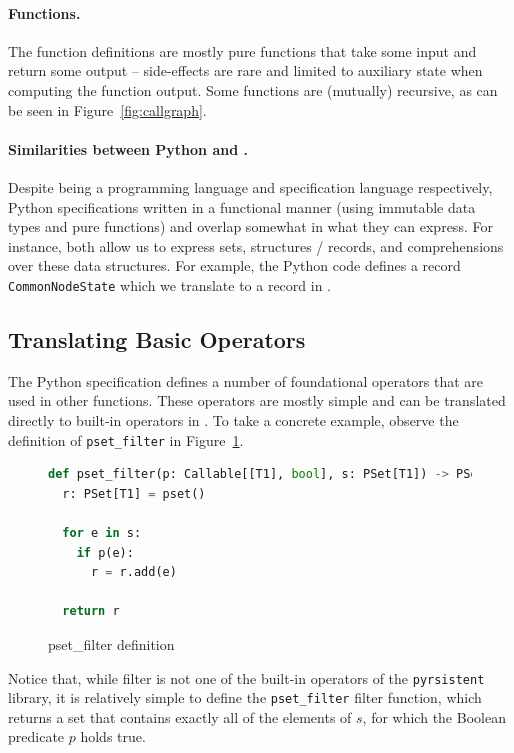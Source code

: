\paragraph{Functions.} The function definitions are mostly pure functions that
take some input and return some output -- side-effects are rare and limited to
auxiliary state when computing the function output. Some functions are
(mutually) recursive, as can be seen in Figure~\ref{fig:callgraph}.

\paragraph{Similarities between Python and \tlap{}.} Despite being a programming
language and specification language respectively, Python specifications written
in a functional manner (using immutable data types and pure functions) and
\tlap{} overlap somewhat in what they can express. For instance, both allow us
to express sets, structures / records, and comprehensions over these data
structures. For example, the Python code defines a record
\texttt{CommonNodeState} which we translate to a record in \tlap{}.

\subsection{Translating Basic Operators}

The Python specification defines a number of
foundational operators that are used in other functions. These operators are
mostly simple and can be translated directly to built-in operators in \tlap{}.
To take a concrete example, observe the definition of \texttt{pset\_filter} in
Figure~\ref{py_filter}.

\begin{figure}
  \begin{lstlisting}[language=Python,style=mystyle]
def pset_filter(p: Callable[[T1], bool], s: PSet[T1]) -> PSet[T1]:
  r: PSet[T1] = pset()
 
  for e in s:
    if p(e):
      r = r.add(e)
  
  return r\end{lstlisting}
\caption{\textsf{pset\_filter} definition\label{py_filter}}
\end{figure}

Notice that, while filter is not one of the built-in operators of the
\texttt{pyrsistent} library, it is relatively simple to define the
\texttt{pset\_filter} filter function, which returns a set that contains exactly
all of the elements of $s$, for which the Boolean predicate $p$ holds true.

